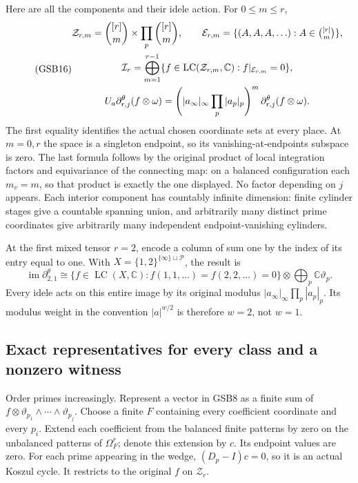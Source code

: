 Here are all the components and their idele action. For $0\le m\le r$,
\begin{equation}\tag{GSB16}
\begin{gathered}
\mathcal Z_{r,m}=\binom{[r]}m\times
                        \prod_p\binom{[r]}m,\qquad
\mathcal E_{r,m}=\{(A,A,A,\ldots):A\in\tbinom{[r]}m\},\\
\mathcal I_r=\bigoplus_{m=1}^{r-1}
  \{f\in\operatorname{LC}(\mathcal Z_{r,m},\mathbb C):
                                          f|_{\mathcal E_{r,m}}=0\},\\
U_a\partial^\theta_{r,j}(f\otimes\omega)
 =\left(|a_\infty|_\infty\prod_p|a_p|_p\right)^m
                      \partial^\theta_{r,j}(f\otimes\omega).
\end{gathered}
\end{equation}
The first equality identifies the actual chosen coordinate sets at
every place. At $m=0,r$ the space is a singleton endpoint, so its
vanishing-at-endpoints subspace is zero. The last formula follows
by the original product of local integration factors and equivariance
of the connecting map: on a balanced configuration each $m_v=m$,
so that product is exactly the one displayed. No factor depending
on $j$ appears. Each interior component has countably infinite
dimension: finite cylinder stages give a countable spanning union,
and arbitrarily many distinct prime coordinates give arbitrarily
many independent endpoint-vanishing cylinders.

At the first mixed tensor $r=2$, encode a column of sum one by the
index of its entry equal to one. With
$X=\{1,2\}^{\{\infty\}\sqcup\mathcal P}$, the result is
\begin{equation}\tag{GSB17}
\operatorname{im}\partial^\theta_{2,1}
 \cong\{f\in\operatorname{LC}(X,\mathbb C):
        f(1,1,\ldots)=f(2,2,\ldots)=0\}
              \otimes\bigoplus_p\mathbb C\vartheta_p.
\end{equation}
Every idele acts on this entire image by its original modulus
$|a_\infty|_\infty\prod_p|a_p|_p$. Its modulus weight in the
convention $|a|^{w/2}$ is therefore $w=2$, not $w=1$.

\subsection{Exact representatives for every class and a nonzero witness}

Order primes increasingly. Represent a vector in GSB8 as a finite
sum of $f\otimes\vartheta_{p_1}\wedge\cdots\wedge\vartheta_{p_j}$.
Choose a finite $F$ containing every coefficient coordinate and every
$p_i$. Extend each coefficient from the balanced finite patterns
by zero on the unbalanced patterns of $\Omega_F^r$; denote this
extension by $c$. Its endpoint values are zero. For each prime
appearing in the wedge, $(D_p-I)c=0$, so it is an actual Koszul
cycle. It restricts to the original $f$ on $\mathcal Z_r$.

